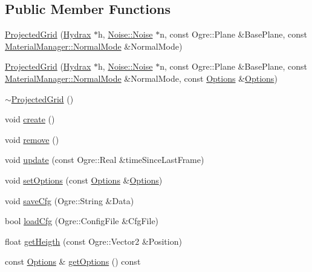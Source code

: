 \subsection*{Public Member Functions}
\begin{CompactItemize}
\item 
\hyperlink{class_hydrax_1_1_module_1_1_projected_grid_ccda1b1a4c84e3da9b8a96e7dcb69a27}{ProjectedGrid} (\hyperlink{class_hydrax_1_1_hydrax}{Hydrax} $\ast$h, \hyperlink{class_hydrax_1_1_noise_1_1_noise}{Noise::Noise} $\ast$n, const Ogre::Plane \&BasePlane, const \hyperlink{class_hydrax_1_1_material_manager_aa14689cd1c259f48954dfecda9b296f}{MaterialManager::NormalMode} \&NormalMode)
\item 
\hyperlink{class_hydrax_1_1_module_1_1_projected_grid_a9308990b99866cbd09edd3600972443}{ProjectedGrid} (\hyperlink{class_hydrax_1_1_hydrax}{Hydrax} $\ast$h, \hyperlink{class_hydrax_1_1_noise_1_1_noise}{Noise::Noise} $\ast$n, const Ogre::Plane \&BasePlane, const \hyperlink{class_hydrax_1_1_material_manager_aa14689cd1c259f48954dfecda9b296f}{MaterialManager::NormalMode} \&NormalMode, const \hyperlink{struct_hydrax_1_1_module_1_1_projected_grid_1_1_options}{Options} \&\hyperlink{struct_hydrax_1_1_module_1_1_projected_grid_1_1_options}{Options})
\item 
\hyperlink{class_hydrax_1_1_module_1_1_projected_grid_7b656225a58519ec687225f1f809010c}{$\sim$ProjectedGrid} ()
\item 
void \hyperlink{class_hydrax_1_1_module_1_1_projected_grid_86e4648a741558934e664f7400082742}{create} ()
\item 
void \hyperlink{class_hydrax_1_1_module_1_1_projected_grid_b878b7d1258aacda8bee0f2e945ea64d}{remove} ()
\item 
void \hyperlink{class_hydrax_1_1_module_1_1_projected_grid_8d7a8efcd6b7fd0e4313c9114bd2c061}{update} (const Ogre::Real \&timeSinceLastFrame)
\item 
void \hyperlink{class_hydrax_1_1_module_1_1_projected_grid_04d04b9cfc173538038a5f51094c1ffa}{setOptions} (const \hyperlink{struct_hydrax_1_1_module_1_1_projected_grid_1_1_options}{Options} \&\hyperlink{struct_hydrax_1_1_module_1_1_projected_grid_1_1_options}{Options})
\item 
void \hyperlink{class_hydrax_1_1_module_1_1_projected_grid_4502387739439e0d6cca1f006fc4a28c}{saveCfg} (Ogre::String \&Data)
\item 
bool \hyperlink{class_hydrax_1_1_module_1_1_projected_grid_f951c58cc93cf75d57e69aa14a668d3e}{loadCfg} (Ogre::ConfigFile \&CfgFile)
\item 
float \hyperlink{class_hydrax_1_1_module_1_1_projected_grid_a7a5b8100642a55f23b4d1c0a125bd62}{getHeigth} (const Ogre::Vector2 \&Position)
\item 
const \hyperlink{struct_hydrax_1_1_module_1_1_projected_grid_1_1_options}{Options} \& \hyperlink{class_hydrax_1_1_module_1_1_projected_grid_0a0aaa55436af95f5cf16aa284d24f57}{getOptions} () const 
\end{CompactItemize}


